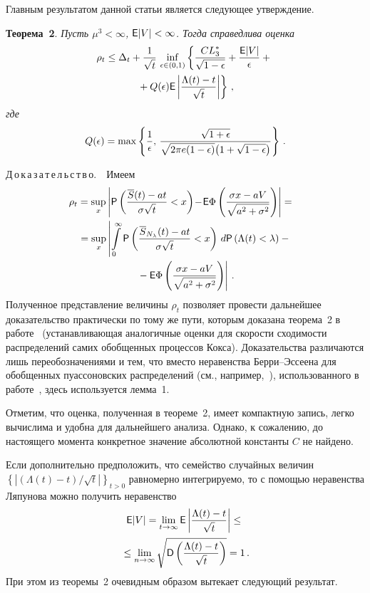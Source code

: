 \begin{multicols}{2}
Главным результатом данной статьи является следующее утверждение.

\smallskip

\noindent
\textbf{Теорема~2}. {\it Пусть $\mu^3<\infty$, ${\sf E} |V| < \infty$.
Тогда справедлива оценка
\begin{multline*}
\rho_t \leq \Delta_t
+\displaystyle\frac{\displaystyle 1\mathstrut}{\displaystyle \sqrt{t}\mathstrut}\,\inf_{\epsilon\in(0,1)}\left\{\displaystyle\frac{\displaystyle CL_3^{*}\mathstrut}{\displaystyle \sqrt{1-\epsilon}\mathstrut}+\displaystyle\frac{\displaystyle {\sf
E}|V|\mathstrut}{\displaystyle \epsilon\mathstrut}+{}\right.\\
\left.{}+Q(\epsilon){\sf
E}\left |\displaystyle\frac{\displaystyle \Lambda(t)-t\mathstrut}{\displaystyle \sqrt{t}\mathstrut}\right |\right\}\,,
\end{multline*}
где}
$$
Q(\epsilon)=\max\left\{\displaystyle\frac{\displaystyle 1\mathstrut}{\displaystyle \epsilon\mathstrut},\,\displaystyle\frac{\displaystyle \sqrt{1+\epsilon}\mathstrut}{\displaystyle \sqrt{2\pi
e(1-\epsilon)}\big(1+\sqrt{1-\epsilon}\big)\mathstrut}\right\}\,.
$$

\smallskip

Д\,о\,к\,а\,з\,а\,т\,е\,л\,ь\,с\,т\,в\,о.\ \, Имеем
\begin{multline*}
\!\!\!\!\rho_t=\sup_x \left| {\sf P}\left(\displaystyle\frac{\displaystyle \overline{S}(t)
-at\mathstrut}{\displaystyle {\sigma\sqrt{t}}\mathstrut}<x\right)\!-\!{\sf E} \Phi\left( \displaystyle\frac{\displaystyle \sigma x -
aV\mathstrut}{\displaystyle {\sqrt{a^2 + \sigma^2}}\mathstrut}\right) \right|={}
\\
{} =\sup_x
\left| \int\limits_0^\infty
{\sf P}\left(\displaystyle\frac{\displaystyle \overline{S}_{N_\lambda}(t)
-at\mathstrut}{\displaystyle {\sigma\sqrt{t}}\mathstrut} < x\right)\,d{\sf P} \left(\Lambda(t) <
\lambda\right) -{}\right.\\
\left.{}- {\sf E} \Phi\left(\displaystyle\frac{\displaystyle \sigma x - aV\mathstrut}{\displaystyle {\sqrt{a^2 +
\sigma^2}}\mathstrut}\right)\right|\,.
\end{multline*}
Полученное представление величины $\rho_t$ позволяет провести
дальнейшее доказательство практически по тому же пути, которым
доказана теорема~2 в работе~\cite{5a} (устанавливающая аналогичные
оценки для скорости сходимости распределений самих обобщенных
процессов Кокса). Доказательства различаются лишь
переобозначениями и тем, что вмес\-то неравенства Берри--Эссеена для
обобщенных пуассоновских распределений (см., например,~\cite{6a}),
использованного в работе~\cite{5a}, здесь используется лемма~1.

\smallskip

Отметим, что оценка, полученная в теореме~2, имеет компактную
запись, легко вычислима и удобна для дальнейшего анализа. Однако,
к сожалению, до настоящего момента конкретное значение абсолютной
константы $C$ не найдено.

Если дополнительно предположить, что семейство случайных величин
$\left\{\left|(\Lambda(t)-t)/\sqrt{t}\right|\right\}_{t>0}
$
равномерно интегрируемо, то с помощью неравенства Ляпунова можно
получить неравенство
\begin{multline}
{\sf E}|V|=\lim_{t\to\infty}{\sf E}\left |\displaystyle\frac{\displaystyle \Lambda(t)-
t\mathstrut}{\displaystyle \sqrt{t}\mathstrut}\right |\le{}\\
{}\le\lim_{n\to\infty}\sqrt{{\sf
D}\left (\displaystyle\frac{\displaystyle \Lambda(t)-t\mathstrut}{\displaystyle \sqrt{t}\mathstrut}\right )}=1\,.
\label{e3a}
\end{multline}
При этом из теоремы~2 очевидным образом вытекает следующий
результат.


\end{multicols}
